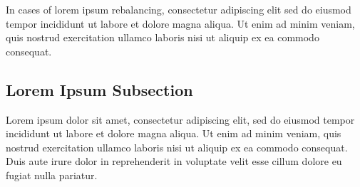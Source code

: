 \documentclass[a4paper,11pt]{article}
\begin{document}
In cases of lorem ipsum rebalancing, consectetur adipiscing elit sed do eiusmod tempor incididunt ut labore et dolore magna aliqua. Ut enim ad minim veniam, quis nostrud exercitation ullamco laboris nisi ut aliquip ex ea commodo consequat.

\subsection{Lorem Ipsum Subsection}

Lorem ipsum dolor sit amet, consectetur adipiscing elit, sed do eiusmod tempor incididunt ut labore et dolore magna aliqua. Ut enim ad minim veniam, quis nostrud exercitation ullamco laboris nisi ut aliquip ex ea commodo consequat. Duis aute irure dolor in reprehenderit in voluptate velit esse cillum dolore eu fugiat nulla pariatur.
\end{document}
